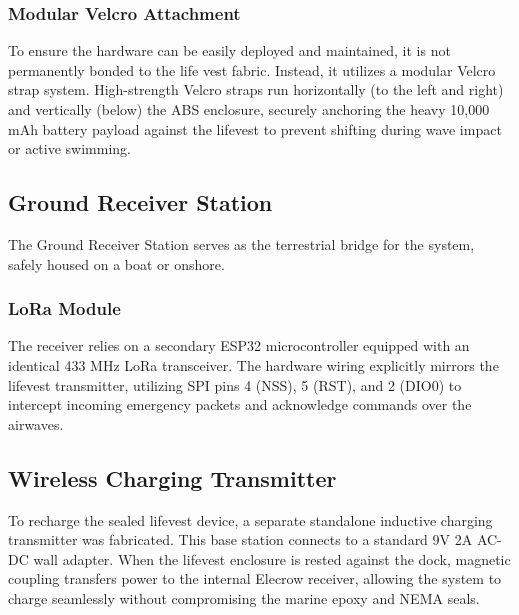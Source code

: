 \documentclass{article}
\begin{document}
\subsubsection{Modular Velcro Attachment}
To ensure the hardware can be easily deployed and maintained, it is not permanently bonded to the life vest fabric. Instead, it utilizes a modular Velcro strap system. High-strength Velcro straps run horizontally (to the left and right) and vertically (below) the ABS enclosure, securely anchoring the heavy 10,000 mAh battery payload against the lifevest to prevent shifting during wave impact or active swimming.

\subsection{Ground Receiver Station}
The Ground Receiver Station serves as the terrestrial bridge for the system, safely housed on a boat or onshore. 

\subsubsection{LoRa Module}
The receiver relies on a secondary ESP32 microcontroller equipped with an identical 433 MHz LoRa transceiver. The hardware wiring explicitly mirrors the lifevest transmitter, utilizing SPI pins 4 (NSS), 5 (RST), and 2 (DIO0) to intercept incoming emergency packets and acknowledge commands over the airwaves.

\subsection{Wireless Charging Transmitter}
To recharge the sealed lifevest device, a separate standalone inductive charging transmitter was fabricated. This base station connects to a standard 9V 2A AC-DC wall adapter. When the lifevest enclosure is rested against the dock, magnetic coupling transfers power to the internal Elecrow receiver, allowing the system to charge seamlessly without compromising the marine epoxy and NEMA seals.




\nocite{*}
\printbibliography
\end{document}
